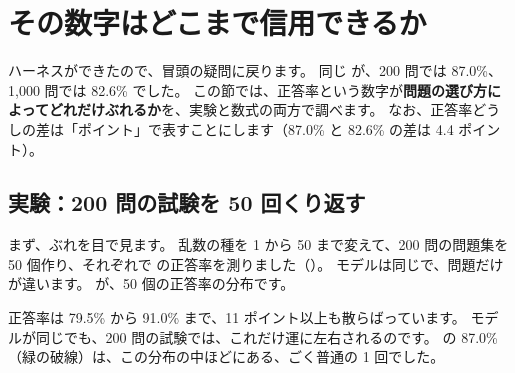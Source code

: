 \section{その数字はどこまで信用できるか}\label{sec:es-stats}

ハーネスができたので、冒頭の疑問に戻ります。
同じ  が、200 問では 87.0\%、1,000 問では 82.6\% でした。
この節では、正答率という数字が\textbf{問題の選び方によってどれだけぶれるか}を、実験と数式の両方で調べます。
なお、正答率どうしの差は「ポイント」で表すことにします（87.0\% と 82.6\% の差は 4.4 ポイント）。

\subsection*{実験：200 問の試験を 50 回くり返す}

まず、ぶれを目で見ます。
乱数の種を 1 から 50 まで変えて、200 問の問題集を 50 個作り、それぞれで  の正答率を測りました（）。
モデルは同じで、問題だけが違います。
が、50 個の正答率の分布です。

正答率は 79.5\% から 91.0\% まで、11 ポイント以上も散らばっています。
モデルが同じでも、200 問の試験では、これだけ運に左右されるのです。
の 87.0\%（緑の破線）は、この分布の中ほどにある、ごく普通の 1 回でした。

